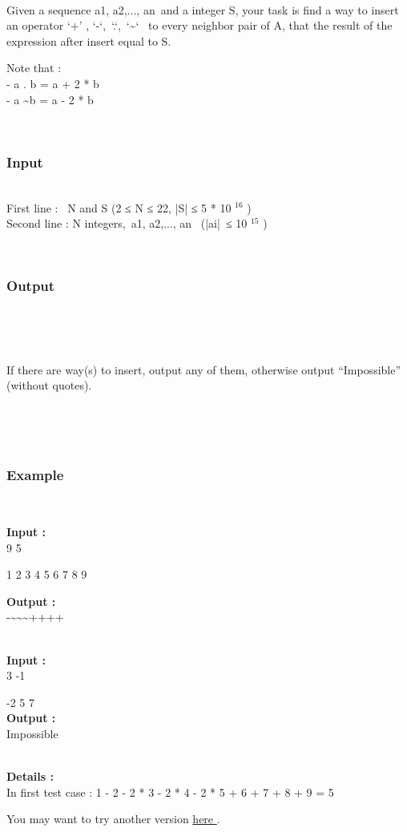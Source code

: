 

 

Given a sequence a1, a2,..., an and a integer S, your task is find a way to insert an operator ‘+’ , ‘-‘, ‘.‘, ‘\textasciitilde‘  to every neighbor pair of A, that the result of the expression after insert equal to S.

Note that :
\\- a . b = a + 2 * b
\\- a \textasciitilde b = a - 2 * b

 

\subsubsection{\textbf{\textbf{Input }}}


\\First line :  N and S (2 ≤ N ≤ 22, |S| ≤ 5 * 10 $^ 16 $ )
\\Second line : N integers, a1, a2,..., an  (|ai| ≤ 10 $^ 15 $ )

 

\subsubsection{\textbf{\textbf{Output }}}

 

 

If there are way(s) to insert, output any of them, otherwise output “Impossible” (without quotes).

 

 

\subsubsection{\textbf{Example }}

 

\textbf{Input : }
\\9 5

1 2 3 4 5 6 7 8 9

\textbf{Output : }
\\-\textasciitilde\textasciitilde\textasciitilde++++


\\\textbf{Input : }
\\3 -1

-2 5 7
\\\textbf{Output : }
\\Impossible


\\\textbf{Details : }
\\In first test case : 1 - 2 - 2 * 3 - 2 * 4 - 2 * 5 + 6 + 7 + 8 + 9 = 5

You may want to try another version \href{/problems/show/BLOPER}{ here } .